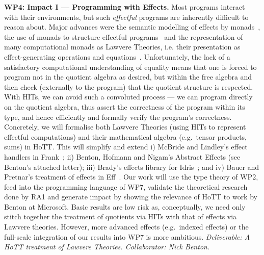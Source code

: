 \documentclass[a4paper,11pt]{article}
\newcommand{\eg}{{e.g.}\ }
\begin{document}
{\bf WP4: Impact I --- Programming with Effects.}  Most programs
interact with their environments, but such \emph{effectful} programs
are inherently difficult to reason about.  Major advances
were the semantic 
modelling of effects by monads~\cite{moggi:monad}, the use of monads
to structure
effectful programs~\cite{wadler:monads} and the representation of many computational
monads as Lawvere Theories, i.e. their presentation as
effect-generating operations and
equations~\cite{PlotkinPower:Lawvere}. Unfortunately, the lack
of a satisfactory computational understanding of equality means that
one is forced to program not in the quotient algebra as desired, but
within the free algebra and then check (externally to the program)
that the quotient structure is respected.  With HITs, we can avoid
such a convoluted process --- we can program directly on the quotient
algebra, thus assert the correctness of the program within its type, and
hence efficiently and formally verify the program's
correctness. Concretely, we will formalise both Lawvere Theories
(using HITs to represent effectful computations) and their
mathematical algebra (e.g.\ tensor products, sums) in HoTT.  This will
simplify and extend i) McBride and Lindley's effect
handlers in Frank~\cite{conor:frank}; ii) Benton, Hofmann and Nigam's Abstract Effects
(see Benton's attached letter); iii) Brady's effects library for
Idris~\cite{brady:effects}; and iv) Bauer and Pretnar's treatment of
 effects in Eff~\cite{bauer:eff}.  Our work will use the type theory of
WP2, feed into the programming language of WP7, validate the
theoretical research done by RA1 and generate impact by showing the
relevance of HoTT to work by Benton at Microsoft. Basic results are low risk as,
conceptually, we need only stitch together the treatment of quotients
via HITs with that of effects via Lawvere theories.  However, more
advanced effects (\eg indexed effects) or the full-scale integration
of our results into WP7 is more ambitious. {\em Deliverable: A HoTT
treatment of Lawvere Theories.  Collaborator: Nick
Benton.  }
\end{document}
